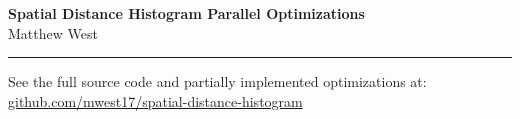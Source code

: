 \documentclass[a4paper,12pt]{article}
\begin{document}
	\pagestyle{fancy}
	\thispagestyle{empty}
	\fancyhead[R]{}
	\fancyhead[L]{}
	\renewcommand*{\thefootnote}{\fnsymbol{footnote}}
	\begin{center}
		\Large{\textbf{Spatial Distance Histogram Parallel Optimizations}}
		\vspace{0.4cm}
		\normalsize
		\\ Matthew West
		\vspace{0.1cm}
		\medskip
		\normalsize
	\end{center}
	{\color{gray}\hrule}
	\vspace{0.4cm}
	\medskip
	\begin{multicols}{2}
	\end{multicols}
	
	\begin{multicols}{2}
	\end{multicols}
	 
 	\vspace{20pt}
	\noindent See the full source code and partially implemented optimizations at:\\ \href{https://github.com/mwest17/spatial-distance-histogram}{github.com/mwest17/spatial-distance-histogram}

\end{document}
